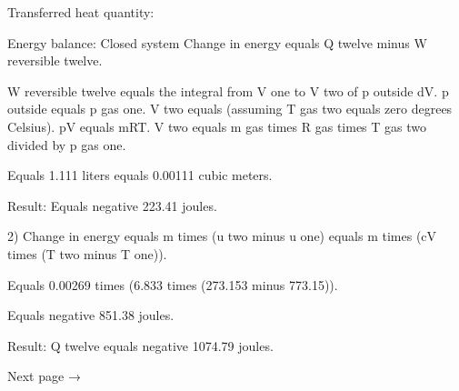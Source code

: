 Transferred heat quantity:  

Energy balance: Closed system  
Change in energy equals Q twelve minus W reversible twelve.  

W reversible twelve equals the integral from V one to V two of p outside dV.  
p outside equals p gas one.  
V two equals (assuming T gas two equals zero degrees Celsius).  
pV equals mRT.  
V two equals m gas times R gas times T gas two divided by p gas one.  

Equals 1.111 liters equals 0.00111 cubic meters.  

Result:  
Equals negative 223.41 joules.  

2)  
Change in energy equals m times (u two minus u one) equals m times (cV times (T two minus T one)).  

Equals 0.00269 times (6.833 times (273.153 minus 773.15)).  

Equals negative 851.38 joules.  

Result:  
Q twelve equals negative 1074.79 joules.  

Next page →